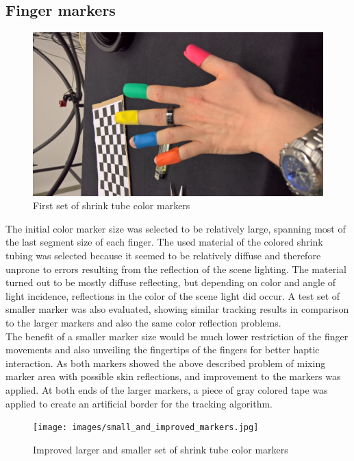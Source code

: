 \subsection{Finger markers}
\begin{figure} 
\centering
\includegraphics[width=\textwidth/2,angle=-90]{images/color_markers_hand.jpg}
\caption{First set of shrink tube color markers }
\label{img:first_set_color_markers}
\end{figure}
The initial color marker size was selected to be relatively large, spanning most of the last segment size of each finger.
The used material of the colored shrink tubing was selected because it seemed to be relatively diffuse and therefore unprone to errors resulting from the reflection of the scene lighting. The material turned out to be mostly diffuse reflecting, but depending on color and angle of light incidence, reflections in the color of the scene light did occur.
A test set of smaller marker was also evaluated, showing similar tracking results in comparison to the larger markers and also the same color reflection problems.\\The benefit of a smaller marker size would be much lower restriction of the finger movements and also unveiling the fingertips of the fingers for better haptic interaction.
As both markers showed the above described problem of mixing marker area with possible skin reflections, and improvement to the markers was applied. At both ends of the larger markers, a piece of gray colored tape was applied to create an artificial border for the tracking algorithm.
\begin{figure}[H]
\centering
\texttt{[image: images/small\_and\_improved\_markers.jpg]}
\caption{Improved larger and smaller set of shrink tube color markers }
\label{img:second_color_markers}
\end{figure}
